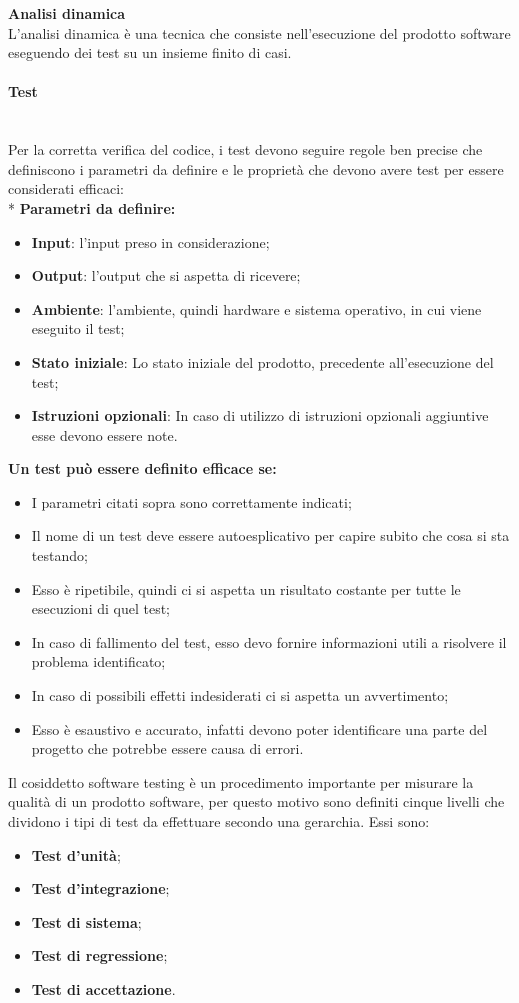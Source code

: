 \textbf{Analisi dinamica} \\ [1mm]
L'analisi dinamica è una tecnica che consiste nell'esecuzione del prodotto software eseguendo dei test su un insieme finito di casi.
\paragraph{Test}\mbox{}\\ [1mm]
Per la corretta verifica del codice, i test devono seguire regole ben precise che definiscono i parametri da definire e le proprietà che devono avere test per essere considerati efficaci: \\*
\textbf{Parametri da definire:}
\begin{itemize}
	\item \textbf{Input}: l'input preso in considerazione;
	\item \textbf{Output}: l'output che si aspetta di ricevere;
	\item \textbf{Ambiente}: l'ambiente, quindi hardware e sistema operativo, in cui viene eseguito il test;
	\item \textbf{Stato iniziale}: Lo stato iniziale del prodotto, precedente all'esecuzione del test;
	\item \textbf{Istruzioni opzionali}: In caso di utilizzo di istruzioni opzionali aggiuntive esse devono essere note.
\end{itemize} 
\textbf{Un test può essere definito efficace se:}
\begin{itemize}
	\item I parametri citati sopra sono correttamente indicati;
	\item Il nome di un test deve essere autoesplicativo per capire subito che cosa si sta testando;
	\item Esso è ripetibile, quindi ci si aspetta un risultato costante per tutte le esecuzioni di quel test;
	\item In caso di fallimento del test, esso devo fornire informazioni utili a risolvere il problema identificato;
	\item In caso di possibili effetti indesiderati ci si aspetta un avvertimento;
	\item Esso è esaustivo e accurato, infatti devono poter identificare una parte del progetto che potrebbe essere causa di errori.
\end{itemize}
Il cosiddetto software testing è un procedimento importante per misurare la qualità di un prodotto software, per questo motivo sono definiti cinque livelli che dividono i tipi di test da effettuare secondo una gerarchia. Essi sono: 
\begin{itemize}
	\item \textbf{Test d'unità};
	\item \textbf{Test d'integrazione};
	\item \textbf{Test di sistema};
	\item \textbf{Test di regressione};
	\item \textbf{Test di accettazione}.
\end{itemize}

